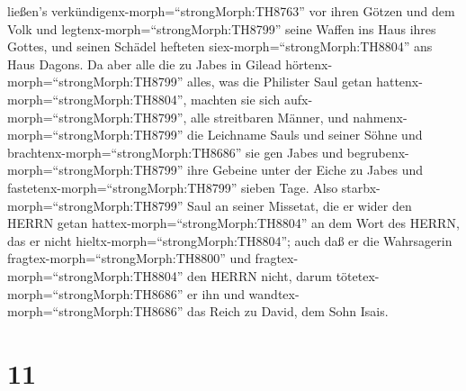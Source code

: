 ließen's verkündigenx-morph=``strongMorph:TH8763'' vor ihren Götzen und
dem Volk  und legtenx-morph=``strongMorph:TH8799'' seine
Waffen ins Haus ihres Gottes, und seinen Schädel hefteten
siex-morph=``strongMorph:TH8804'' ans Haus Dagons.  Da aber
alle die zu Jabes in Gilead hörtenx-morph=``strongMorph:TH8799'' alles,
was die Philister Saul getan hattenx-morph=``strongMorph:TH8804'',
 machten sie sich aufx-morph=``strongMorph:TH8799'', alle
streitbaren Männer, und nahmenx-morph=``strongMorph:TH8799'' die
Leichname Sauls und seiner Söhne und
brachtenx-morph=``strongMorph:TH8686'' sie gen Jabes und
begrubenx-morph=``strongMorph:TH8799'' ihre Gebeine unter der Eiche zu
Jabes und fastetenx-morph=``strongMorph:TH8799'' sieben Tage.
 Also starbx-morph=``strongMorph:TH8799'' Saul an seiner
Missetat, die er wider den HERRN getan
hattex-morph=``strongMorph:TH8804'' an dem Wort des HERRN, das er nicht
hieltx-morph=``strongMorph:TH8804''; auch daß er die Wahrsagerin
fragtex-morph=``strongMorph:TH8800''  und
fragtex-morph=``strongMorph:TH8804'' den HERRN nicht, darum
tötetex-morph=``strongMorph:TH8686'' er ihn und
wandtex-morph=``strongMorph:TH8686'' das Reich zu David, dem Sohn Isais.

\hypertarget{section-10}{%
\section{11}\label{section-10}}

